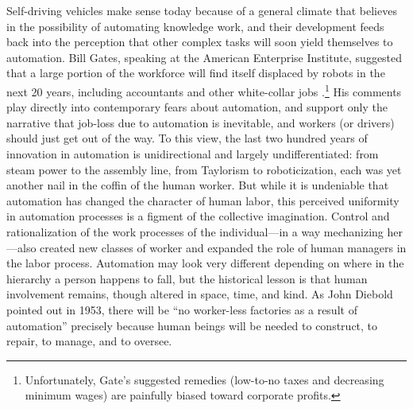 Self-driving vehicles make sense today because of
a general climate that believes in the possibility of automating
knowledge work, and their development feeds back into the perception
that other complex tasks will soon yield themselves to automation. Bill
Gates, speaking at the American Enterprise Institute,
suggested that a large portion of the workforce will find itself
displaced by robots in the next 20 years, including accountants and
other white-collar
jobs \cite{gatesRobots}.\footnote{Unfortunately, Gate's suggested remedies (low-to-no taxes and decreasing minimum
wages) are painfully biased toward corporate profits.}
His comments play directly into
contemporary fears about automation, and support only the
narrative that job-loss due to automation is inevitable, and workers
(or drivers)
should just get out of the way. To this view, the last two hundred
years of innovation in automation is unidirectional and largely
undifferentiated:  from steam power to the assembly line, from
Taylorism to roboticization, each was yet another nail in the coffin
of the human worker. But
while it is undeniable that automation has changed the
character of human labor, this perceived uniformity in automation
processes is a figment of the collective imagination. Control and
rationalization of
the work processes of the individual---in a way mechanizing her---also
created new classes of worker and expanded the role of human managers
in the labor process. Automation may look very
different depending on where in the hierarchy 
a person happens to fall, but the historical lesson is that human
involvement remains, though altered in space, time, and kind. As John
Diebold pointed out in 1953, there will be ``no worker-less
factories as a result of automation'' \cite[p. 63-64]{dieboldNew}
precisely because human beings will be needed to construct, to repair,
to manage, and to oversee.





